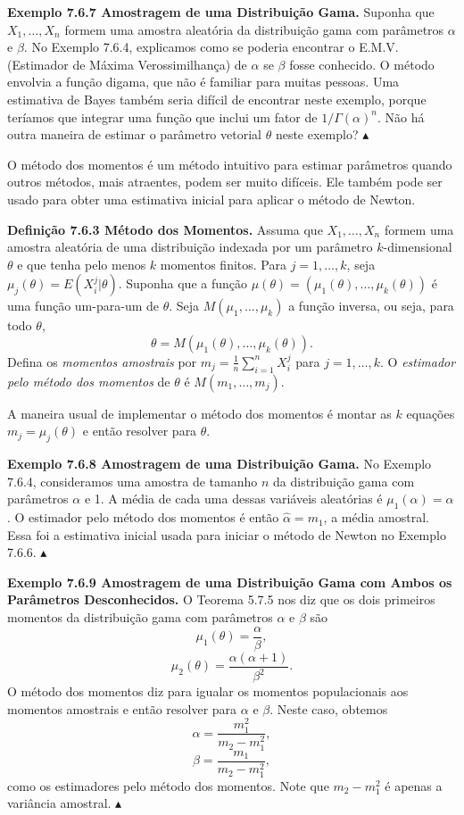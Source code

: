 \textbf{Exemplo 7.6.7 Amostragem de uma Distribuição Gama.} Suponha que $X_1, \dots, X_n$ formem uma amostra aleatória da distribuição gama com parâmetros $\alpha$ e $\beta$. No Exemplo 7.6.4, explicamos como se poderia encontrar o E.M.V. (Estimador de Máxima Verossimilhança) de $\alpha$ se $\beta$ fosse conhecido. O método envolvia a função digama, que não é familiar para muitas pessoas. Uma estimativa de Bayes também seria difícil de encontrar neste exemplo, porque teríamos que integrar uma função que inclui um fator de $1/\Gamma(\alpha)^n$. Não há outra maneira de estimar o parâmetro vetorial $\theta$ neste exemplo? $\blacktriangle$

O método dos momentos é um método intuitivo para estimar parâmetros quando outros métodos, mais atraentes, podem ser muito difíceis. Ele também pode ser usado para obter uma estimativa inicial para aplicar o método de Newton.

\textbf{Definição 7.6.3 Método dos Momentos.} Assuma que $X_1, \dots, X_n$ formem uma amostra aleatória de uma distribuição indexada por um parâmetro $k$-dimensional $\theta$ e que tenha pelo menos $k$ momentos finitos. Para $j = 1, \dots, k$, seja $\mu_j(\theta) = E(X_i^j|\theta)$. Suponha que a função $\mu(\theta) = (\mu_1(\theta), \dots, \mu_k(\theta))$ é uma função um-para-um de $\theta$. Seja $M(\mu_1, \dots, \mu_k)$ a função inversa, ou seja, para todo $\theta$,
$$ \theta = M(\mu_1(\theta), \dots, \mu_k(\theta)). $$
Defina os \textit{momentos amostrais} por $m_j = \frac{1}{n}\sum_{i=1}^n X_i^j$ para $j = 1, \dots, k$. O \textit{estimador pelo método dos momentos} de $\theta$ é $M(m_1, \dots, m_j)$.

A maneira usual de implementar o método dos momentos é montar as $k$ equações $m_j = \mu_j(\theta)$ e então resolver para $\theta$.

\textbf{Exemplo 7.6.8 Amostragem de uma Distribuição Gama.} No Exemplo 7.6.4, consideramos uma amostra de tamanho $n$ da distribuição gama com parâmetros $\alpha$ e 1. A média de cada uma dessas variáveis aleatórias é $\mu_1(\alpha) = \alpha$. O estimador pelo método dos momentos é então $\hat{\alpha} = m_1$, a média amostral. Essa foi a estimativa inicial usada para iniciar o método de Newton no Exemplo 7.6.6. $\blacktriangle$

\textbf{Exemplo 7.6.9 Amostragem de uma Distribuição Gama com Ambos os Parâmetros Desconhecidos.} O Teorema 5.7.5 nos diz que os dois primeiros momentos da distribuição gama com parâmetros $\alpha$ e $\beta$ são
$$ \mu_1(\theta) = \frac{\alpha}{\beta}, $$
$$ \mu_2(\theta) = \frac{\alpha(\alpha+1)}{\beta^2}. $$
O método dos momentos diz para igualar os momentos populacionais aos momentos amostrais e então resolver para $\alpha$ e $\beta$. Neste caso, obtemos
$$ \hat{\alpha} = \frac{m_1^2}{m_2 - m_1^2}, $$
$$ \hat{\beta} = \frac{m_1}{m_2 - m_1^2}, $$
como os estimadores pelo método dos momentos. Note que $m_2 - m_1^2$ é apenas a variância amostral. $\blacktriangle$

